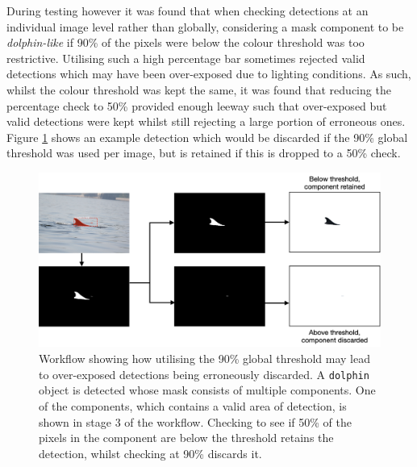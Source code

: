 During testing however it was found that when checking detections at an individual image level rather than globally, considering a mask component to be \textit{dolphin-like} if 90\% of the pixels were below the colour threshold was too restrictive. Utilising such a high percentage bar sometimes rejected valid detections which may have been over-exposed due to lighting conditions. As such, whilst the colour threshold was kept the same, it was found that reducing the percentage check to 50\% provided enough leeway such that over-exposed but valid detections were kept whilst still rejecting a large portion of erroneous ones. Figure \ref{fig:190723-001-MOLS0752_-fin-removed-at-90-kept-at-50} shows an example detection which would be discarded if the 90\% global threshold was used per image, but is retained if this is dropped to a 50\% check.

\begin{figure}
	\begin{center}
		\includegraphics[width=\linewidth]{Chapter5/figs/190723-001-MOLS0752_-fin-removed-at-90-kept-at-50.png}
	\end{center}
	\caption[Workflow showing how utilising the 90\% global threshold may lead to over-exposed detections being erroneously discarded.]{Workflow showing how utilising the 90\% global threshold may lead to over-exposed detections being erroneously discarded. A \texttt{dolphin} object is detected whose mask consists of multiple components.  One of the components, which contains a valid area of detection, is shown in stage 3 of the workflow. Checking to see if 50\% of the pixels in the component are below the threshold retains the detection, whilst checking at 90\% discards it.}\label{fig:190723-001-MOLS0752_-fin-removed-at-90-kept-at-50}
\end{figure}

